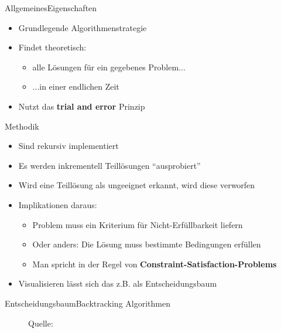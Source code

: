 \begin{frame}{Allgemeines}{Eigenschaften}
    \begin{itemize}
        \item Grundlegende Algorithmenstrategie
        \item Findet theoretisch:
        \begin{itemize}
        \item alle Lösungen für ein gegebenes Problem...
        \item ...in einer endlichen Zeit
        \end{itemize}
        \item Nutzt das \textbf{trial and error} Prinzip
    \end{itemize}
\end{frame}

\begin{frame}{Methodik}
    \begin{itemize}
        \item Sind rekursiv implementiert
        \item Es werden inkrementell Teillösungen "`ausprobiert"'
        \item Wird eine Teillösung als ungeeignet erkannt, wird diese verworfen
        \item Implikationen daraus:
        \begin{itemize}
            \item Problem muss ein Kriterium für Nicht-Erfüllbarkeit liefern
            \item Oder anders: Die Lösung muss bestimmte Bedingungen erfüllen
            \item Man spricht in der Regel von \textbf{Constraint-Satisfaction-Problems}
        \end{itemize}
        \item Visualisieren lässt sich das z.B. als Entscheidungsbaum
    \end{itemize}
\end{frame}

\begin{frame}{Entscheidungsbaum}{Backtracking Algorithmen}
    \begin{figure}
    \caption*{Quelle: \cite{wiki:backtr}}
    \end{figure}
\end{frame}

